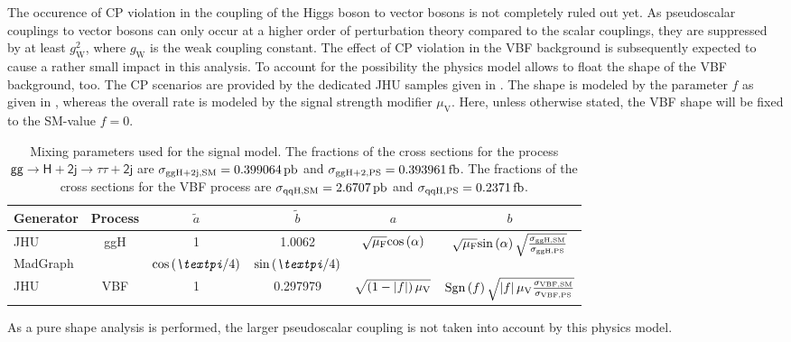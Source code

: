 The occurence of CP violation in the coupling of the Higgs boson to vector bosons is not completely ruled out yet. As pseudoscalar couplings to vector bosons can only occur at a higher order
of perturbation theory compared to the scalar couplings, they are suppressed by at least $g_\text{W}^2$, where $g_\text{W}$ is the weak coupling constant. The effect of CP violation in the VBF background is subsequently expected to cause a rather small impact in this analysis.
To account for the possibility the physics model allows to float the shape of the VBF background, too. The CP scenarios are provided by the dedicated JHU samples given in . The shape is modeled by the parameter $f$  as given in , whereas the overall rate is modeled by the signal strength modifier $\mu_\text{V}$.
Here, unless otherwise stated, the VBF shape will be fixed to the SM-value $f=0$.
\begin{table}[!]
    \centering
    \caption[Signal model mixing parameters.]{Mixing parameters used for the signal model. The fractions of the cross sections for the process $\mathsf{gg\rightarrow H+2j\rightarrow \tau\tau+2j}$  are $\sigma_\text{ggH+2j,SM} = \text{0.399064\,pb}$ and $\sigma_\text{ggH+2,PS} = \text{0.393961\,fb}$.
    The fractions of the cross sections for the VBF process are $\sigma_\text{qqH,SM} = \text{2.6707\,pb}$ and $\sigma_\text{qqH,PS} = \text{0.2371\,fb}$.}\label{SA:generator_normalizations}
    \begin{tabular}{lccccc}
        \toprule
        Generator & Process                     & $\tilde{a}$& $\tilde{b}$ & $a$ & $b$ \\ \hline
        JHU       &   \multirow{2}{*}{ggH}      &   1    &   1.0062     & \multirow{2}{*}{$\mathsf{\sqrt{\mu_\text{F}}\text{cos}\left( {\alpha}\right) }$} & \multirow{2}{*}{$\sqrt{\mu_\text{F}}\text{sin}\left({\alpha}\right)\sqrt{\frac{\sigma_\text{ggH,SM}}{\sigma_\text{ggH,PS}}}$} \\
        MadGraph  &                             &$\text{cos}\li{\pi/4} \re$ & $\text{sin}\li{\pi/4}\re$&                                 & \\ \midrule
        JHU       & \multirow{1}{*}{VBF}        &   1       &  0.297979              &   $\sqrt{\left( 1-\left| f \right| \right) \mu_\text{V}}$& $\text{Sgn}\left( f \right) \sqrt{\left| f \right| \mu_\text{V} \frac{\sigma_\text{VBF,SM}}{\sigma_\text{VBF,PS}}}$
    \end{tabular}
\end{table}%
As a pure shape analysis is performed, the larger pseudoscalar coupling is not taken into account by this physics model. 
